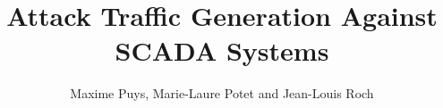 \documentclass{beamer}
\title{Attack Traffic Generation Against SCADA Systems}
\author{Maxime Puys, Marie-Laure Potet and Jean-Louis Roch}
\institute{VERIMAG, University of Grenoble Alpes, France}
\date{}
\begin{document}
\begin{frame}[t]
        \begin{columns}[T]
            \begin{column}{.49\textwidth}
                \begin{tcolorbox}[adjusted title={\centering\large Industrial Systems}]
                    \centering
                    \vspace{1.1em}
                    \begin{columns}
                        \begin{column}{.3\textwidth}
                        \end{column}
                        \begin{column}{.3\textwidth}
\end{column}
\end{columns}
\end{tcolorbox}
\end{column}
\end{columns}
\end{frame}
\end{document}
